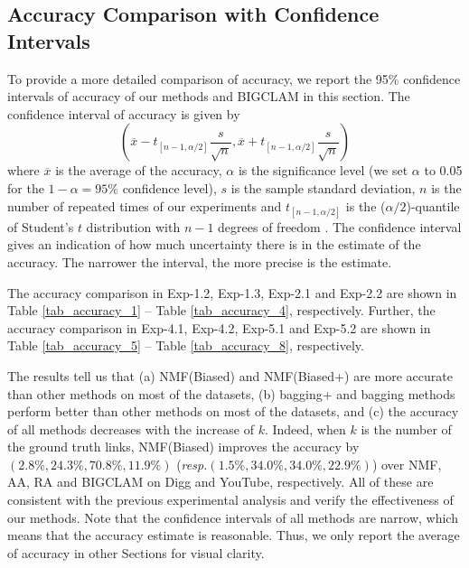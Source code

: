 \documentclass[10pt,journal,compsoc]{IEEEtran}
\newcommand{\NMF}{{\sf NMF}\xspace }
\newcommand{\Biased}{{\sf NMF(Biased)}\xspace}
\newcommand{\Aa}{{\sf AA}\xspace }
\newcommand{\RA}{{\sf RA}\xspace }
\newcommand{\BIGCLAM}{{\sf BIGCLAM}\xspace}
\newcommand{\Digg}{{\sf Digg}\xspace}
\newcommand{\YouTube}{{\sf YouTube}\xspace}
\newcommand{\Biasedp}{{\sf NMF(Biased+)}\xspace}
\newcommand{\resp}{\emph{resp.}\xspace}
\begin{document}
\subsection{Accuracy Comparison with Confidence Intervals}
To provide a more detailed comparison of accuracy, we
report the 95\% confidence intervals of accuracy of our
methods and \BIGCLAM in this section. The confidence interval of
accuracy is given by
\[ (\overline{x} - t_{[n-1,\alpha/2]}\frac{s}{\sqrt{n}}, \overline{x} + t_{[n-1,\alpha/2]}\frac{s}{\sqrt{n}})  \]
where $\overline{x}$ is the average of the accuracy, $\alpha$ is the significance level
(we set $\alpha$ to 0.05 for the $1 - \alpha = 95\%$ confidence level),
$s$ is the sample standard deviation, $n$ is the number of repeated
times of our experiments and $t_{[n-1,\alpha/2]}$ is the ($\alpha/2$)-quantile
of Student's $t$ distribution with $n - 1$ degrees of freedom \cite{stati}.
The confidence interval gives an indication of how much uncertainty there is in
the estimate of the accuracy. The narrower the interval, the more precise is the estimate.

The accuracy comparison in Exp-1.2, Exp-1.3, Exp-2.1 and Exp-2.2 are shown in
Table \ref{tab_accuracy_1} -- Table \ref{tab_accuracy_4}, respectively.
Further, the accuracy comparison in Exp-4.1, Exp-4.2, Exp-5.1 and Exp-5.2 are shown in
Table \ref{tab_accuracy_5} -- Table \ref{tab_accuracy_8}, respectively.


The results tell us that (a) \Biased and \Biasedp are more accurate than other methods
on most of the datasets, (b) bagging+ and bagging methods perform
better than other methods on most of the datasets,
and (c) the accuracy of all methods decreases with the increase of $k$.
Indeed, when $k$ is the number of the ground truth links, \Biased improves
the accuracy by $(2.8\%, 24.3\%, 70.8\%, 11.9\%)$ (\resp $(1.5\%, 34.0\%, 34.0\%, 22.9\%)$)
over \NMF, \Aa, \RA and \BIGCLAM on \Digg and \YouTube, respectively.
All of these are consistent with the previous experimental analysis and
verify the effectiveness of our methods. Note that the confidence intervals
of all methods are narrow, which means that the accuracy estimate is reasonable.
Thus, we only report the average of accuracy in other Sections for visual clarity.
\end{document}
